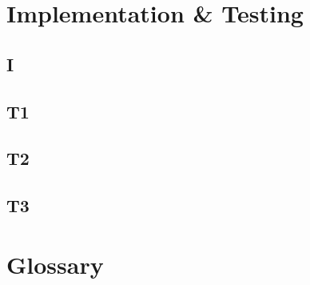 \documentclass[a4paper,10pt,titlepage,bibtotoc,bibtotocnumbered]{scrreprt}
\begin{document}
\chapter{Implementation \& Testing}


\section{I}

\section{T1}

\section{T2}

\section{T3}




\chapter{Glossary}
\end{document}
